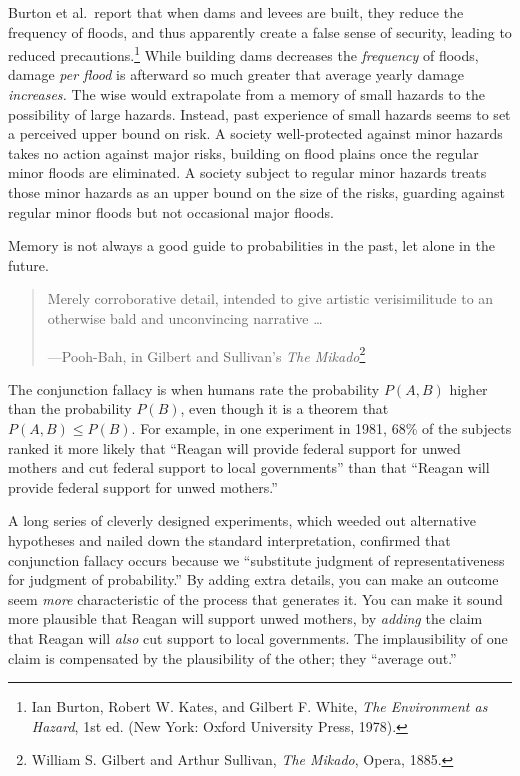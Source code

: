 {
 Burton et al.~report that when dams and levees are built, they
reduce the frequency of floods, and thus apparently create a false
sense of security, leading to reduced precautions.\footnote{Ian Burton, Robert W. Kates, and Gilbert F. White, \textit{The
Environment as Hazard}, 1st ed. (New York: Oxford University Press,
1978).}
While building dams decreases the \textit{frequency} of floods, damage
\textit{per flood} is afterward so much greater that average yearly
damage \textit{increases.} The wise would extrapolate from a memory of
small hazards to the possibility of large hazards. Instead, past
experience of small hazards seems to set a perceived upper bound on
risk. A society well-protected against minor hazards takes no action
against major risks, building on flood plains once the regular minor
floods are eliminated. A society subject to regular minor hazards
treats those minor hazards as an upper bound on the size of the risks,
guarding against regular minor floods but not occasional major floods.}

{
 Memory is not always a good guide to probabilities in the past,
let alone in the future.}

\myendsectiontext


\bigskip


\begin{quote}
{
 Merely corroborative detail, intended to give artistic
verisimilitude to an otherwise bald and unconvincing narrative \ldots}

{\raggedleft
 {}---Pooh-Bah, in Gilbert and Sullivan's
\textit{The Mikado}\footnote{William S. Gilbert and Arthur Sullivan, \textit{The Mikado},
Opera, 1885.}
\par}
\end{quote}


{
 The conjunction fallacy is when humans rate the probability $P(A,B)$
higher than the probability $P(B)$, even though it is a theorem that
$P(A,B) \leq P(B)$. For example, in one experiment in 1981, 68\% of
the subjects ranked it more likely that ``Reagan will
provide federal support for unwed mothers and cut federal support to
local governments'' than that
``Reagan will provide federal support for unwed
mothers.''}

{
 A long series of cleverly designed experiments, which weeded out
alternative hypotheses and nailed down the standard interpretation,
confirmed that conjunction fallacy occurs because we
``substitute judgment of representativeness for
judgment of probability.'' By adding extra details,
you can make an outcome seem \textit{more} characteristic of the
process that generates it. You can make it sound more plausible that
Reagan will support unwed mothers, by \textit{adding} the claim that
Reagan will \textit{also} cut support to local governments. The
implausibility of one claim is compensated by the plausibility of the
other; they ``average out.''}

